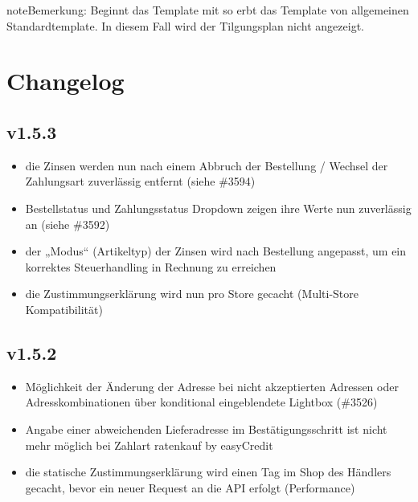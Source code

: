 \documentclass[a4paper,10pt,openany,oneside,ngerman]{sphinxmanual}
\begin{document}
\begin{sphinxadmonition}{note}{Bemerkung:}
Beginnt das Template mit  so erbt das Template von allgemeinen Standardtemplate. In diesem Fall wird der Tilgungsplan nicht angezeigt.
\end{sphinxadmonition}


\chapter{Changelog}
\label{\detokenize{changelog::doc}}\label{\detokenize{changelog:changelog}}

\section{v1.5.3}
\label{\detokenize{changelog:v1-5-3}}\begin{itemize}
\item {} 
die Zinsen werden nun nach einem Abbruch der Bestellung / Wechsel der Zahlungsart zuverlässig entfernt (siehe \#3594)

\item {} 
Bestellstatus und Zahlungsstatus Dropdown zeigen ihre Werte nun zuverlässig an (siehe \#3592)

\item {} 
der „Modus“ (Artikeltyp) der Zinsen wird nach Bestellung angepasst, um ein korrektes Steuerhandling in Rechnung zu erreichen

\item {} 
die Zustimmungserklärung wird nun pro Store gecacht (Multi-Store Kompatibilität)

\end{itemize}


\section{v1.5.2}
\label{\detokenize{changelog:v1-5-2}}\begin{itemize}
\item {} 
Möglichkeit der Änderung der Adresse bei nicht akzeptierten Adressen oder Adresskombinationen über konditional eingeblendete Lightbox (\#3526)

\item {} 
Angabe einer abweichenden Lieferadresse im Bestätigungsschritt ist nicht mehr möglich bei Zahlart ratenkauf by easyCredit

\item {} 
die statische Zustimmungserklärung wird einen Tag im Shop des Händlers gecacht, bevor ein neuer Request an die API erfolgt (Performance)

\end{itemize}
\end{document}
